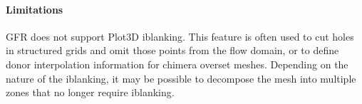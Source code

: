 



\paragraph{Limitations}


GFR does not support Plot3D iblanking.
%
This feature is often used to cut holes in structured grids and omit those
points from the flow domain, or to define donor interpolation information
for chimera overset meshes.
%
Depending on the nature of the iblanking, it may be possible to decompose the
mesh into multiple zones that no longer require iblanking.


